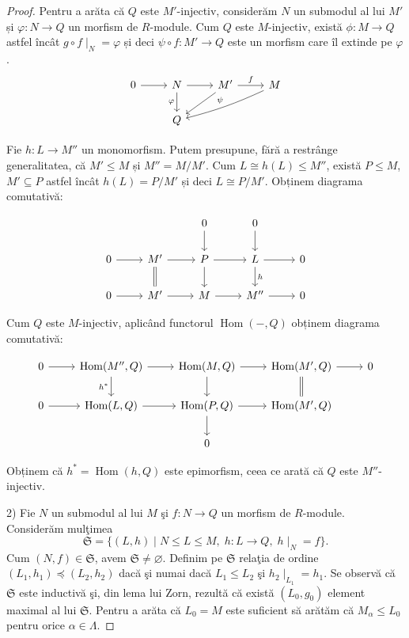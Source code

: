 \documentclass[12pt,a4paper]{book}
\DeclareMathOperator{\Hom}{Hom}
\theoremstyle{plain}
\theoremstyle{definition}
\theoremstyle{remark}
\begin{document}
\begin{proof}
Pentru a arăta că \(Q\) este \(M'\)-injectiv, considerăm \(N\) un submodul al lui
\(M'\) și \(\varphi : N \rightarrow Q\) un morfism de \(R\)-module. Cum \(Q\) este
\(M\)-injectiv, există \(\phi : M \to Q\) astfel încât \(g \circ f\!\mid_{N} = \varphi\)
și deci \(\psi \circ f : M' \to Q\) este un morfism care îl extinde pe \(\varphi\).
\[
\begin{tikzcd}
0 \arrow[r] &
N \arrow[r] \arrow[d,"\varphi"'] &
M' \arrow[r,"f"] \arrow[dl] &
M \arrow[dll,bend left=5,"\psi"'] \\
& Q & &
\end{tikzcd}
\]

Fie \(h : L \to M''\) un monomorfism. Putem presupune, fără a restrânge generalitatea,
că \(M' \le M\) și \(M'' = M / M'\). Cum \(L \cong h(L) \le M''\), există
\(P \le M\), \(M' \subseteq P\) astfel încât \(h(L) = P / M'\) și deci \(L \cong P/M'\).
Obținem diagrama comutativă:

\[
\begin{tikzcd}
& & 0 \arrow[d] & 0 \arrow[d] & \\
0 \arrow[r] &
M' \arrow[r] \arrow[d, equal] &
P \arrow[r] \arrow[d] &
L \arrow[r] \arrow[d,"h"] &
0 \\
0 \arrow[r] &
M' \arrow[r] &
M \arrow[r] &
M'' \arrow[r] &
0
\end{tikzcd}
\]

Cum \(Q\) este \(M\)-injectiv, aplicând functorul \(\Hom(-,Q)\) obținem diagrama comutativă:


\[
\begin{tikzcd}
0 \arrow[r] &
\Hom(M'',Q) \arrow[r] \arrow[d,"h^{*}"'] &
\Hom(M,Q) \arrow[r] \arrow[d] &
\Hom(M',Q) \arrow[r] \arrow[d,equal] &
0 \\
0 \arrow[r] &
\Hom(L,Q) \arrow[r] &
\Hom(P,Q) \arrow[r] \arrow[d] &
\Hom(M',Q) &
\\
& & 0 & &
\end{tikzcd}
\]


Obținem că \(h^{*} = \Hom(h,Q)\) este epimorfism, ceea ce arată că
\(Q\) este \(M''\)-injectiv.


\medskip

2) Fie \(N\) un submodul al lui \(M\) şi \(f : N \to Q\) un morfism de \(R\)-module.
Considerăm mulţimea
\[
\mathfrak{S} = \{(L,h) \mid N \le L \le M,\; h : L \to Q,\; h\!\mid_{N} = f\}.
\]
Cum \((N,f) \in \mathfrak{S}\), avem \(\mathfrak{S} \ne \varnothing\).
Definim pe \(\mathfrak{S}\) relaţia de ordine
\((L_1,h_1) \preccurlyeq (L_2,h_2)\) dacă şi numai dacă
\(L_1 \le L_2\) şi \(h_2\!\mid_{L_1} = h_1\).
Se observă că \(\mathfrak{S}\) este inductivă şi, din lema lui Zorn,
rezultă că există \((L_0,g_0)\) element maximal al lui \(\mathfrak{S}\).
Pentru a arăta că \(L_0 = M\) este suficient să arătăm că
\(M_\alpha \le L_0\) pentru orice \(\alpha \in \Lambda\).


\end{proof}
\end{document}
